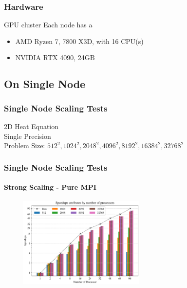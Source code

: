 \begin{frame}
  \frametitle{Hardware}
  \begin{block}{GPU cluster}
    Each node has a
    \begin{itemize}
      \item AMD Ryzen 7, 7800 X3D, with 16 CPU(s)
      \item NVIDIA RTX 4090, 24GB
    \end{itemize}
  \end{block}

\end{frame}

\subsection{On Single Node}
\begin{frame}
  \frametitle{Single Node Scaling Tests}
  2D Heat Equation\\
  Single Precision \\
  Problem Size: $512^2, 1024^2, 2048^2, 4096^2, 8192^2, 16384^2, 32768^2$ \\




\end{frame}


\begin{frame}
  \frametitle{Single Node Scaling Tests}
  \framesubtitle{Strong Scaling - Pure MPI}
  \begin{figure}[htbp]
    \centering
    \includegraphics[width=0.56\textwidth]{figure/FIG_Benchmark_pure_mpi.pdf}
    \label{FIG:Benchmark:PURE_MPI}
  \end{figure}
\end{frame}



